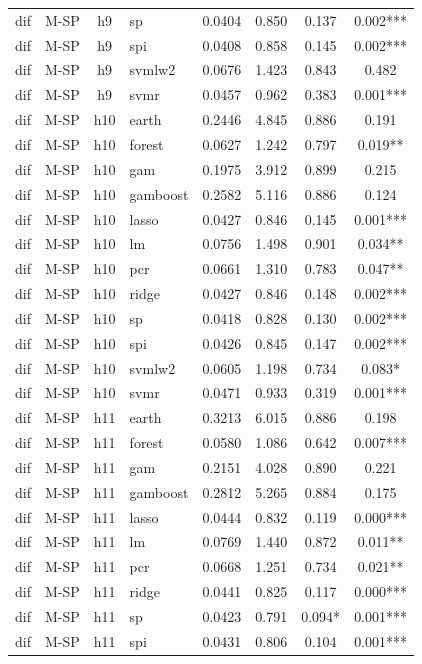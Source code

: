 \begin{ThreePartTable}
\begin{longtable}[t]{llclcccc}
dif & M-SP & h9 & sp & 0.0404 & 0.850 & 0.137 & 0.002***\\
dif & M-SP & h9 & spi & 0.0408 & 0.858 & 0.145 & 0.002***\\
dif & M-SP & h9 & svmlw2 & 0.0676 & 1.423 & 0.843 & 0.482\\
dif & M-SP & h9 & svmr & 0.0457 & 0.962 & 0.383 & 0.001***\\
\addlinespace
dif & M-SP & h10 & earth & 0.2446 & 4.845 & 0.886 & 0.191\\
dif & M-SP & h10 & forest & 0.0627 & 1.242 & 0.797 & 0.019**\\
dif & M-SP & h10 & gam & 0.1975 & 3.912 & 0.899 & 0.215\\
dif & M-SP & h10 & gamboost & 0.2582 & 5.116 & 0.886 & 0.124\\
dif & M-SP & h10 & lasso & 0.0427 & 0.846 & 0.145 & 0.001***\\
dif & M-SP & h10 & lm & 0.0756 & 1.498 & 0.901 & 0.034**\\
dif & M-SP & h10 & pcr & 0.0661 & 1.310 & 0.783 & 0.047**\\
dif & M-SP & h10 & ridge & 0.0427 & 0.846 & 0.148 & 0.002***\\
dif & M-SP & h10 & sp & 0.0418 & 0.828 & 0.130 & 0.002***\\
dif & M-SP & h10 & spi & 0.0426 & 0.845 & 0.147 & 0.002***\\
dif & M-SP & h10 & svmlw2 & 0.0605 & 1.198 & 0.734 & 0.083*\\
dif & M-SP & h10 & svmr & 0.0471 & 0.933 & 0.319 & 0.001***\\
\addlinespace
dif & M-SP & h11 & earth & 0.3213 & 6.015 & 0.886 & 0.198\\
dif & M-SP & h11 & forest & 0.0580 & 1.086 & 0.642 & 0.007***\\
dif & M-SP & h11 & gam & 0.2151 & 4.028 & 0.890 & 0.221\\
dif & M-SP & h11 & gamboost & 0.2812 & 5.265 & 0.884 & 0.175\\
dif & M-SP & h11 & lasso & 0.0444 & 0.832 & 0.119 & 0.000***\\
dif & M-SP & h11 & lm & 0.0769 & 1.440 & 0.872 & 0.011**\\
dif & M-SP & h11 & pcr & 0.0668 & 1.251 & 0.734 & 0.021**\\
dif & M-SP & h11 & ridge & 0.0441 & 0.825 & 0.117 & 0.000***\\
dif & M-SP & h11 & sp & 0.0423 & 0.791 & 0.094* & 0.001***\\
dif & M-SP & h11 & spi & 0.0431 & 0.806 & 0.104 & 0.001***\\

\end{longtable}
\end{ThreePartTable}
